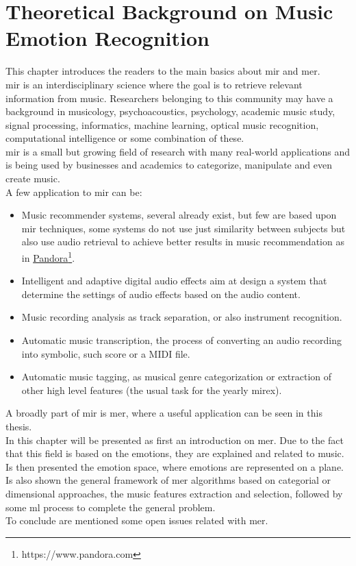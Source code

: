  \chapter{Theoretical Background on Music Emotion Recognition}
\label{chap:TheoreticalBackgroundMER}
\pagestyle{plain}
\vspace{0.5cm}

This chapter introduces the readers to the main basics about \gls{mir} and \gls{mer}.
\\
\gls{mir} is an interdisciplinary science where the goal is to retrieve relevant information from music. Researchers belonging to this community may have a background in musicology, psychoacoustics, psychology, academic music study, signal processing, informatics, machine learning, optical music recognition, computational intelligence or some combination of these.
\\ \indent
\gls{mir} is a small but growing field of research with many real-world applications and is being used by businesses and academics to categorize, manipulate and even create music.
\\
A few application to \gls{mir} can be:
\begin{itemize}
	\item Music recommender systems, several already exist, but few are based upon \gls{mir} techniques, some systems do not use just similarity between subjects but also use audio retrieval to achieve better results in music recommendation as in \href{https://www.pandora.com}{Pandora}\footnote{https://www.pandora.com}. 
	\item Intelligent and adaptive digital audio effects aim at design a system that determine the settings of audio effects based on the audio content.
	\item Music recording analysis as track separation, or also instrument recognition.
	\item Automatic music transcription, the process of converting an audio recording into symbolic, such score or a MIDI file.
	\item Automatic music tagging, as musical genre categorization or extraction of other high level features (the usual task for the yearly \gls{mirex}).
\end{itemize}
A broadly part of \gls{mir} is \gls{mer}, where a useful application can be seen in this thesis.
\\
In this chapter will be presented as first an introduction on \gls{mer}. Due to the fact that this field is based on the emotions, they are explained and related to music. Is then presented the emotion space, where emotions are represented on a plane.
\\
Is also shown the general framework of \gls{mer} algorithms based on categorial or dimensional approaches, the music features extraction and selection, followed by some \gls{ml} process to complete the general problem.
\\
To conclude are mentioned some open issues related with \gls{mer}.

